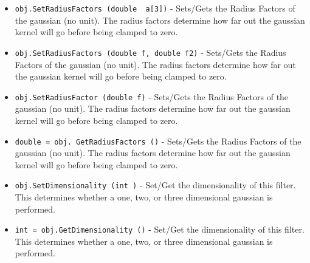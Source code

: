 \begin{itemize}
\item  \verb|obj.SetRadiusFactors (double  a[3])| -  Sets/Gets the Radius Factors of the gaussian (no unit).
 The radius factors determine how far out the gaussian kernel will 
 go before being clamped to zero.

\item  \verb|obj.SetRadiusFactors (double f, double f2)| -  Sets/Gets the Radius Factors of the gaussian (no unit).
 The radius factors determine how far out the gaussian kernel will 
 go before being clamped to zero.

\item  \verb|obj.SetRadiusFactor (double f)| -  Sets/Gets the Radius Factors of the gaussian (no unit).
 The radius factors determine how far out the gaussian kernel will 
 go before being clamped to zero.

\item  \verb|double = obj. GetRadiusFactors ()| -  Sets/Gets the Radius Factors of the gaussian (no unit).
 The radius factors determine how far out the gaussian kernel will 
 go before being clamped to zero.

\item  \verb|obj.SetDimensionality (int )| -  Set/Get the dimensionality of this filter. This determines whether
 a one, two, or three dimensional gaussian is performed.

\item  \verb|int = obj.GetDimensionality ()| -  Set/Get the dimensionality of this filter. This determines whether
 a one, two, or three dimensional gaussian is performed.

\end{itemize}

